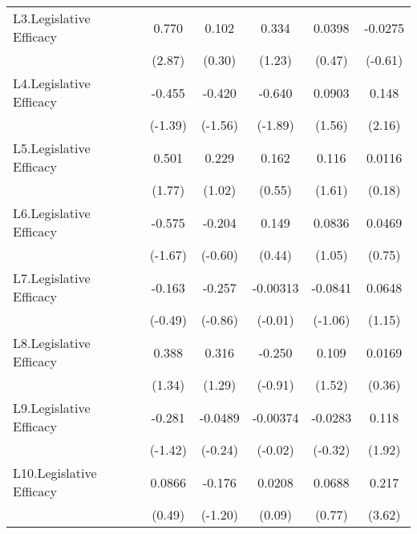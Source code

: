 {\begin{longtable}{l*{5}{c}}
\addlinespace
L3.Legislative Efficacy&    0.770\sym{**} &    0.102         &    0.334         &   0.0398         &  -0.0275         \\
                &   (2.87)         &   (0.30)         &   (1.23)         &   (0.47)         &  (-0.61)         \\
\addlinespace
L4.Legislative Efficacy&   -0.455         &   -0.420         &   -0.640         &   0.0903         &    0.148\sym{*}  \\
                &  (-1.39)         &  (-1.56)         &  (-1.89)         &   (1.56)         &   (2.16)         \\
\addlinespace
L5.Legislative Efficacy&    0.501         &    0.229         &    0.162         &    0.116         &   0.0116         \\
                &   (1.77)         &   (1.02)         &   (0.55)         &   (1.61)         &   (0.18)         \\
\addlinespace
L6.Legislative Efficacy&   -0.575         &   -0.204         &    0.149         &   0.0836         &   0.0469         \\
                &  (-1.67)         &  (-0.60)         &   (0.44)         &   (1.05)         &   (0.75)         \\
\addlinespace
L7.Legislative Efficacy&   -0.163         &   -0.257         & -0.00313         &  -0.0841         &   0.0648         \\
                &  (-0.49)         &  (-0.86)         &  (-0.01)         &  (-1.06)         &   (1.15)         \\
\addlinespace
L8.Legislative Efficacy&    0.388         &    0.316         &   -0.250         &    0.109         &   0.0169         \\
                &   (1.34)         &   (1.29)         &  (-0.91)         &   (1.52)         &   (0.36)         \\
\addlinespace
L9.Legislative Efficacy&   -0.281         &  -0.0489         & -0.00374         &  -0.0283         &    0.118         \\
                &  (-1.42)         &  (-0.24)         &  (-0.02)         &  (-0.32)         &   (1.92)         \\
\addlinespace
L10.Legislative Efficacy&   0.0866         &   -0.176         &   0.0208         &   0.0688         &    0.217\sym{***}\\
                &   (0.49)         &  (-1.20)         &   (0.09)         &   (0.77)         &   (3.62)         \\

\end{longtable}}
